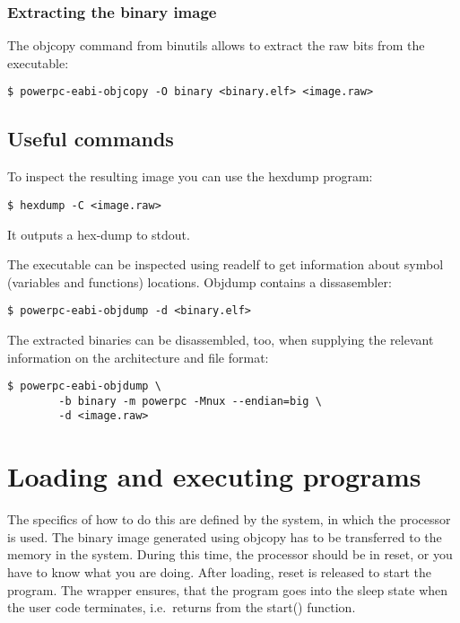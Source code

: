 \subsubsection{Extracting the binary image}

The objcopy command from binutils allows to extract the raw bits from the executable:
\begin{lstlisting}
$ powerpc-eabi-objcopy -O binary <binary.elf> <image.raw>
\end{lstlisting}


\subsection{Useful commands}

To inspect the resulting image you can use the hexdump program:
\begin{lstlisting}
$ hexdump -C <image.raw>
\end{lstlisting}
It outputs a hex-dump to stdout.

The executable can be inspected using readelf to get information about symbol (variables and functions) locations.
Objdump contains a dissasembler:
\begin{lstlisting}
$ powerpc-eabi-objdump -d <binary.elf>
\end{lstlisting}
The extracted binaries can be disassembled, too, when supplying the relevant information on the architecture and file format:
\begin{lstlisting}
$ powerpc-eabi-objdump \
        -b binary -m powerpc -Mnux --endian=big \
        -d <image.raw>
\end{lstlisting}


\section{Loading and executing programs}

The specifics of how to do this are defined by the system, in which the processor is used.
The binary image generated using objcopy has to be transferred to the memory in the system.
During this time, the processor should be in reset, or you have to know what you are doing.
After loading, reset is released to start the program.
The \code{crt.s} wrapper ensures, that the program goes into the sleep state when the user code terminates, i.e.\ returns from the start() function.



